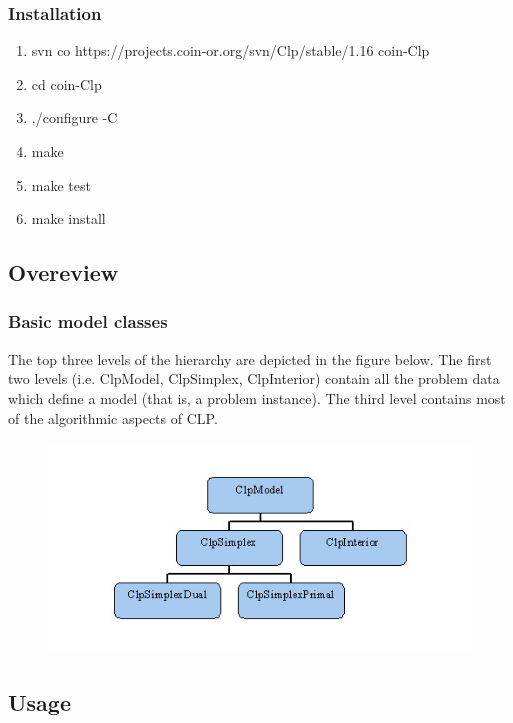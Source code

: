 \documentclass{beamer}
\begin{document}
\begin{frame}
\frametitle{Installation}
\begin{enumerate}
 \item svn co https://projects.coin-or.org/svn/Clp/stable/1.16 coin-Clp
 \item cd coin-Clp
 \item ./configure -C
 \item make 
 \item make test
 \item make install
\end{enumerate}
\end{frame}


\subsection{Overeview}

\begin{frame}
 \frametitle{Basic model classes}
 The top three levels of the hierarchy are depicted in the figure below. The first two levels (i.e. ClpModel, ClpSimplex, ClpInterior) contain all the problem data which define a model (that is, a problem instance). The third level contains most of the algorithmic aspects of CLP.
 \begin{figure}
  \includegraphics[width=0.8\linewidth]{clpbasicmodelhier}
 \end{figure}
\end{frame}


\subsection{Usage}

\begin{frame}[fragile]

\end{frame}
\end{document}
